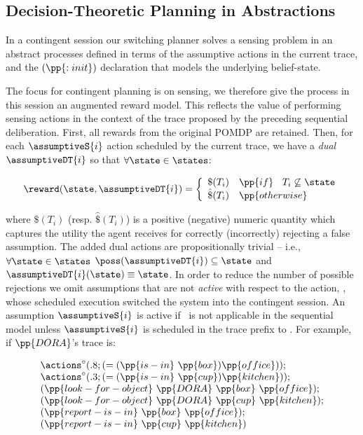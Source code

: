 \subsection{Decision-Theoretic Planning in Abstractions}

In a contingent session our switching planner solves a sensing problem
in an abstract processes defined in terms of the assumptive actions in
the current trace, and the $(\pp{:init})$ declaration that models the
underlying belief-state.

The focus for contingent planning is on sensing, we therefore give the
process in this session an augmented reward model.  This reflects the
value of performing sensing actions in the context of the trace
proposed by the preceding sequential deliberation. First, all rewards
from the original POMDP are retained. Then, for each $\assumptiveS{i}$
action scheduled by the current trace, we have a {\em dual}
$\assumptiveDT{i}$ so that $\forall\state\in\states$:

\[
\reward(\state, \assumptiveDT{i}) = \bigg\{ \begin{array}{ll}
\$(T_i) & \pp{if}~\;\;T_i \not\subseteq \state \\
\hat\$(T_i) & \pp{otherwise} \\
\end{array}
\]

\noindent where $\$(T_i)$ (resp. $\hat\$(T_i)$) is a positive
(negative) numeric quantity which captures the utility the agent
receives for correctly (incorrectly) rejecting a false assumption. The
added dual actions are propositionally trivial -- i.e.,
$\forall\state\in\states$ $\poss(\assumptiveDT{i})
\subseteq \state$ and $\assumptiveDT{i}(\state) \equiv \state$.  
In order to reduce the number of possible rejections we omit
assumptions that are not {\em active} with respect to the action,
\switchAction, whose scheduled execution switched the system into
the contingent session. An assumption $\assumptiveS{i}$ is active if
\switchAction\ is not applicable in the sequential model unless
$\assumptiveS{i}$ is scheduled in the trace prefix
to \switchAction. For example, if $\pp{DORA}$'s trace is:

\[
\begin{array}{l}
\actions^{\circ}(.8;(=(\pp{is-in}~\pp{box})\pp{office}));\\
\actions^{\circ}(.3;(=(\pp{is-in}~\pp{cup})\pp{kitchen}));\\
(\pp{look-for-object}~\pp{DORA}~\pp{box}~\pp{office});\\
(\pp{look-for-object}~\pp{DORA}~\pp{cup}~\pp{kitchen});\\
(\pp{report-is-in}~\pp{box}~\pp{office}); \\
(\pp{report-is-in}~\pp{cup}~\pp{kitchen})
\end{array}
\]

